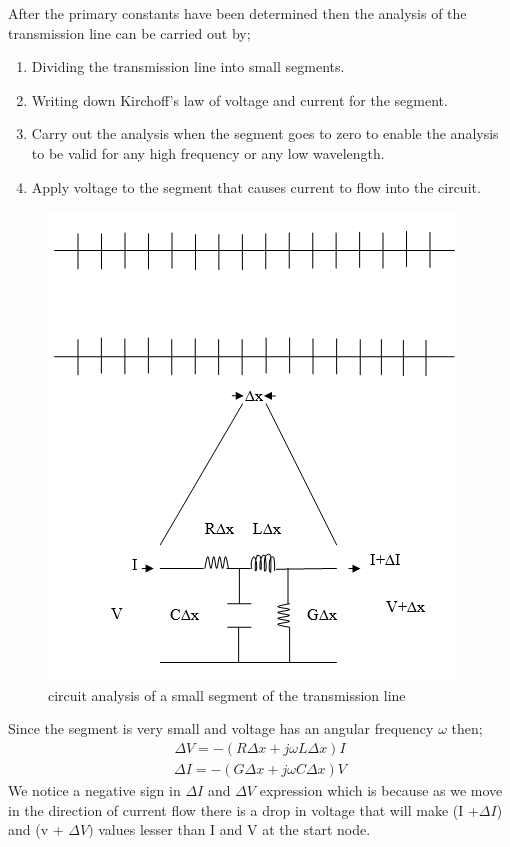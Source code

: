 After the primary constants have been determined then the analysis of the transmission line can be carried out by;
\begin{enumerate}
\itemsep0em
\item Dividing the transmission line into small segments.
\item Writing down Kirchoff's law of voltage and current for the segment.
\item Carry out the analysis when the segment goes to zero to enable the analysis to be valid for any high frequency or any low wavelength. 
\item Apply voltage to the segment that causes current to flow into the circuit.
\end{enumerate}
\begin{figure}[h]
\centering
\includegraphics[scale=0.4]{./graphics/seventh}
\caption{circuit analysis of a small segment of the transmission line}
\end{figure}
Since the segment is very small and voltage has an angular frequency $ \omega $ then;
\begin{align}  
\Delta V = - (R \Delta x + j\omega L\Delta x)I
\label{eqn:voltage}
\end{align}
\begin{align}
\Delta I = - (G \Delta x + j \omega C \Delta x)V
\label{eqn:current}
\end{align}
We notice a negative sign in $ \Delta I $ and $ \Delta V $ expression which is because as we move in the direction of current flow there is a drop in voltage that will make (I +$  \Delta I $) and (v + $ \Delta V) $ values lesser than I and V at the start node.

